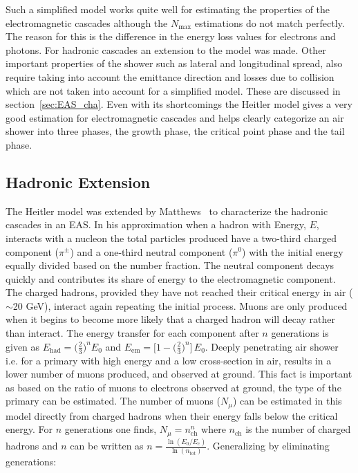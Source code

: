 Such a simplified model works quite well for estimating the properties of the electromagnetic cascades although the $N_{\text{max}}$ estimations do not match perfectly. The reason for this is the difference in the energy loss values for electrons and photons. For hadronic cascades an extension to the model was made. Other important properties of the shower such as lateral and longitudinal spread, also require taking into account the emittance direction and losses due to collision which are not taken into account for a simplified model. These are discussed in section~\ref{sec:EAS_cha}. Even with its shortcomings the Heitler model gives a very good estimation for electromagnetic cascades and helps clearly categorize an air shower into three phases, the growth phase, the critical point phase and the tail phase. 

\subsection{Hadronic Extension}
\label{sec:Dev_Had}
The Heitler model was extended by Matthews~\cite{MATTHEWS2005387} to characterize the hadronic cascades in an EAS. In his approximation when a hadron with Energy, $E$, interacts with a nucleon the total particles produced have a two-third charged component ($\pi^\pm $) and a one-third neutral component ($\pi^0$) with the initial energy equally divided based on the number fraction. The neutral component decays quickly and contributes its share of energy to the electromagnetic component. The charged hadrons, provided they have not reached their critical energy in air ($\sim$20 GeV), interact again repeating the initial process. Muons are only produced when it begins to become more likely that a charged hadron will decay rather than interact. The energy transfer for each component after $n$ generations is given as $E_{\text{had}} = \biggl(\frac{2}{3}\biggr)^n E_0$ and $E_{\text{em}} = \big[1- \biggl(  \frac{2}{3}\biggr)^n\big] \, E_0$. Deeply penetrating air shower i.e. for a primary with high energy and a low cross-section in air, results in a lower number of muons produced, and observed at ground. This fact is important as based on the ratio of muons to electrons observed at ground, the type of the primary can be estimated. The number of muons ($N_{\mu}$) can be estimated in this model directly from charged hadrons when their energy falls below the critical energy. For $n$ generations one finds, $N_{\mu} = n_{\text{ch}}^n$ where $n_{\text{ch}}$ is the number of charged hadrons and $n$ can be written as $n = \frac{\ln(E_0/E_c)}{\ln(n_{\text{tot}})}$. Generalizing by eliminating generations:

